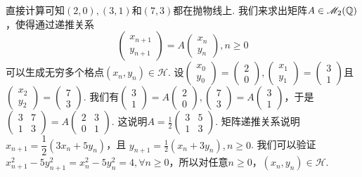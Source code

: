 \begin{solution}
  直接计算可知$(2,0),(3,1)$和$(7,3)$都在抛物线上. 我们来求出矩阵$A\in\mathscr M_2(\mathbb Q)$，使得通过递推关系
  \[
    \begin{pmatrix}
      x_{n+1} \\
      y_{n+1}
    \end{pmatrix} = A
    \begin{pmatrix}
      x_n \\
      y_n
    \end{pmatrix}, n\ge0
  \]
  可以生成无穷多个格点$(x_n,y_n)\in\mathscr H$. 设$\begin{pmatrix}
    x_0 \\
    y_0
  \end{pmatrix}=\begin{pmatrix}
    2 \\
    0
  \end{pmatrix},\begin{pmatrix}
    x_1 \\
    y_1
  \end{pmatrix}=\begin{pmatrix}
    3 \\
    1
  \end{pmatrix}$且$\begin{pmatrix}
    x_2 \\
    y_2
  \end{pmatrix}=\begin{pmatrix}
    7 \\
    3
  \end{pmatrix}$. 我们有$\begin{pmatrix}
    3 \\
    1
  \end{pmatrix}=A\begin{pmatrix}
    2 \\
    0
  \end{pmatrix},\begin{pmatrix}
    7 \\
    3
  \end{pmatrix}=A\begin{pmatrix}
    3 \\
    1
  \end{pmatrix}$，于是$\begin{pmatrix}
    3 & 7 \\
    1 & 3
  \end{pmatrix}=A\begin{pmatrix}
    2 & 3 \\
    0 & 1
  \end{pmatrix}$. 这说明$A=\frac12\begin{pmatrix}
    3 & 5 \\
    1 & 3
  \end{pmatrix}$. 矩阵递推关系说明$x_{n+1}=\dfrac12(3x_n+5y_n)$，且
  $y_{n+1}=\frac12(x_n+3y_n),n\ge0$. 我们可以验证$x_{n+1}^2-5y_{n+1}^2=x_n^2-5y_n^2=4,\forall n\ge0$，所以对任意$n\ge0$，$(x_n,y_n)\in\mathscr H$.
\end{solution}

